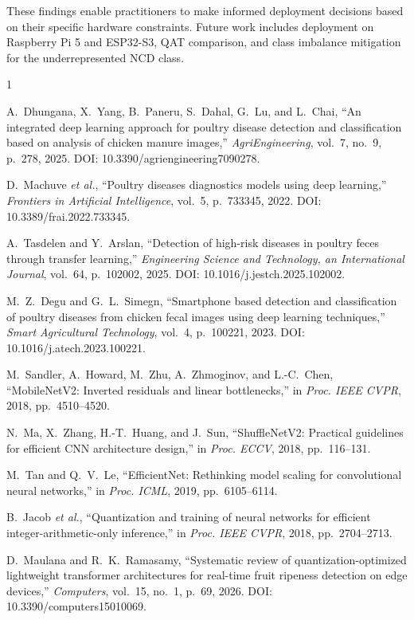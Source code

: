 \documentclass[conference,a4paper]{IEEEtran}
\begin{document}
These findings enable practitioners to make informed deployment decisions based on their specific hardware constraints. Future work includes deployment on Raspberry Pi 5 and ESP32-S3, QAT comparison, and class imbalance mitigation for the underrepresented NCD class.

\begin{thebibliography}{1}

A.~Dhungana, X.~Yang, B.~Paneru, S.~Dahal, G.~Lu, and L.~Chai, ``An integrated deep learning approach for poultry disease detection and classification based on analysis of chicken manure images,'' \emph{AgriEngineering}, vol.~7, no.~9, p.~278, 2025. DOI: 10.3390/agriengineering7090278.

D.~Machuve \textit{et al.}, ``Poultry diseases diagnostics models using deep learning,'' \emph{Frontiers in Artificial Intelligence}, vol.~5, p.~733345, 2022. DOI: 10.3389/frai.2022.733345.

A.~Tasdelen and Y.~Arslan, ``Detection of high-risk diseases in poultry feces through transfer learning,'' \emph{Engineering Science and Technology, an International Journal}, vol.~64, p.~102002, 2025. DOI: 10.1016/j.jestch.2025.102002.

M.~Z.~Degu and G.~L.~Simegn, ``Smartphone based detection and classification of poultry diseases from chicken fecal images using deep learning techniques,'' \emph{Smart Agricultural Technology}, vol.~4, p.~100221, 2023. DOI: 10.1016/j.atech.2023.100221.

M.~Sandler, A.~Howard, M.~Zhu, A.~Zhmoginov, and L.-C.~Chen, ``MobileNetV2: Inverted residuals and linear bottlenecks,'' in \emph{Proc. IEEE CVPR}, 2018, pp.~4510--4520.

N.~Ma, X.~Zhang, H.-T.~Huang, and J.~Sun, ``ShuffleNetV2: Practical guidelines for efficient CNN architecture design,'' in \emph{Proc. ECCV}, 2018, pp.~116--131.

M.~Tan and Q.~V.~Le, ``EfficientNet: Rethinking model scaling for convolutional neural networks,'' in \emph{Proc. ICML}, 2019, pp.~6105--6114.

B.~Jacob \textit{et al.}, ``Quantization and training of neural networks for efficient integer-arithmetic-only inference,'' in \emph{Proc. IEEE CVPR}, 2018, pp.~2704--2713.

D.~Maulana and R.~K.~Ramasamy, ``Systematic review of quantization-optimized lightweight transformer architectures for real-time fruit ripeness detection on edge devices,'' \emph{Computers}, vol.~15, no.~1, p.~69, 2026. DOI: 10.3390/computers15010069.


\end{thebibliography}
\end{document}
